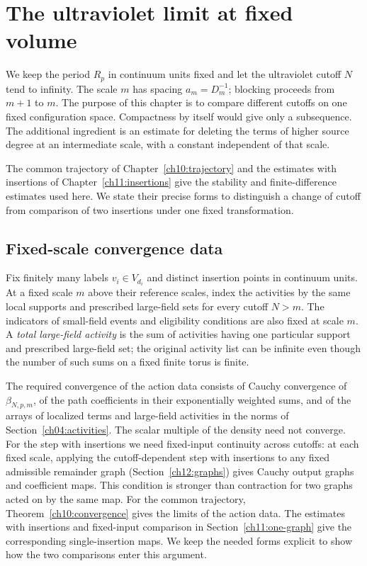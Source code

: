 \chapter{The ultraviolet limit at fixed volume}
\label{ch12:ultraviolet}

We keep the period $R_p$ in continuum units fixed and let the ultraviolet cutoff
$N$ tend to infinity. The scale $m$ has spacing $a_m=D_m^{-1}$;
blocking proceeds from $m+1$ to $m$. The purpose of this chapter is to
compare different cutoffs on one fixed configuration space. Compactness
by itself would give only a subsequence. The additional ingredient is an
estimate for deleting the terms of higher source degree at an intermediate scale,
with a constant independent of that scale.

The common trajectory of Chapter~\ref{ch10:trajectory} and the
estimates with insertions of Chapter~\ref{ch11:insertions} give the stability
and finite-difference estimates used here. We state their precise
forms to distinguish a change of cutoff from comparison of two
insertions under one fixed transformation.

\section{Fixed-scale convergence data}
\label{ch12:inputs}

Fix finitely many labels $v_i\in V_{d_i}$ and distinct insertion points in continuum units.
At a fixed scale $m$ above their reference scales, index the activities
by the same local supports and prescribed large-field sets for
every cutoff $N>m$. The indicators of small-field events and eligibility conditions
are also fixed at scale $m$. A \emph{total large-field activity} is the sum of activities
having one particular support and prescribed large-field set; the original activity
list can be infinite even though the number of such sums on a
fixed finite torus is finite.

The required convergence of the action data consists of Cauchy convergence of
$\beta_{N,p,m}$, of the path coefficients in their exponentially
weighted sums, and of the arrays of localized terms and large-field activities in
the norms of Section~\ref{ch04:activities}. The scalar multiple of the
density need not converge. For the step with insertions we need
fixed-input continuity across cutoffs: at each fixed scale, applying
the cutoff-dependent step with insertions to any fixed admissible remainder
graph (Section~\ref{ch12:graphs}) gives Cauchy output graphs and coefficient maps. This condition
is stronger than contraction for two graphs acted on by the same map.
For the common trajectory, Theorem~\ref{ch10:convergence} gives
the limits of the action data. The estimates with insertions and fixed-input comparison
in Section~\ref{ch11:one-graph} give the corresponding single-insertion
maps. We keep the needed forms explicit to show how the two
comparisons enter this argument.

